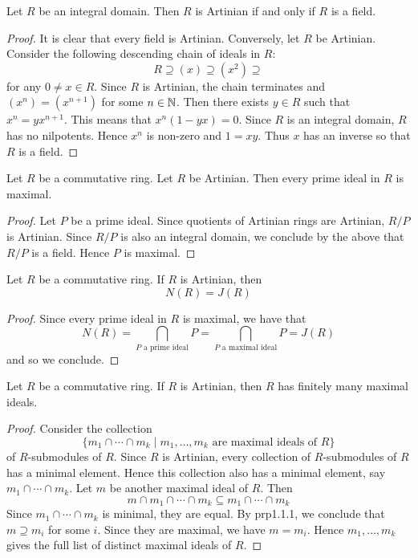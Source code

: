 \documentclass[a4paper]{article}
\begin{document}
\begin{prp}{}{} Let $R$ be an integral domain. Then $R$ is Artinian if and only if $R$ is a field. \tcbline
\begin{proof}
It is clear that every field is Artinian. Conversely, let $R$ be Artinian. Consider the following descending chain of ideals in $R$: $$R\supseteq(x)\supseteq(x^2)\supseteq$$ for any $0\neq x\in R$. Since $R$ is Artinian, the chain terminates and $(x^n)=(x^{n+1})$ for some $n\in\mathbb{N}$. Then there exists $y\in R$ such that $x^n=yx^{n+1}$. This means that $x^n(1-yx)=0$. Since $R$ is an integral domain, $R$ has no nilpotents. Hence $x^n$ is non-zero and $1=xy$. Thus $x$ has an inverse so that $R$ is a field. 
\end{proof}
\end{prp}

\begin{prp}{}{} Let $R$ be a commutative ring. Let $R$ be Artinian. Then every prime ideal in $R$ is maximal. \tcbline
\begin{proof}
Let $P$ be a prime ideal. Since quotients of Artinian rings are Artinian, $R/P$ is Artinian. Since $R/P$ is also an integral domain, we conclude by the above that $R/P$ is a field. Hence $P$ is maximal. 
\end{proof}
\end{prp}

\begin{prp}{}{} Let $R$ be a commutative ring. If $R$ is Artinian, then $$N(R)=J(R)$$ \tcbline
\begin{proof}
Since every prime ideal in $R$ is maximal, we have that $$N(R)=\bigcap_{P\text{ a prime ideal}}P=\bigcap_{P\text{ a maximal ideal}}P=J(R)$$ and so we conclude. 
\end{proof}
\end{prp}

\begin{prp}{}{} Let $R$ be a commutative ring. If $R$ is Artinian, then $R$ has finitely many maximal ideals. \tcbline
\begin{proof}
Consider the collection $$\{m_1\cap\cdots\cap m_k\;|\;m_1,\dots,m_k\text{ are maximal ideals of }R\}$$ of $R$-submodules of $R$. Since $R$ is Artinian, every collection of $R$-submodules of $R$ has a minimal element. Hence this collection also has a minimal element, say $m_1\cap\cdots\cap m_k$. Let $m$ be another maximal ideal of $R$. Then $$m\cap m_1\cap\cdots\cap m_k\subseteq m_1\cap\cdots\cap m_k$$ Since $m_1\cap\cdots\cap m_k$ is minimal, they are equal. By prp1.1.1, we conclude that $m\supseteq m_i$ for some $i$. Since they are maximal, we have $m=m_i$. Hence $m_1,\dots,m_k$ gives the full list of distinct maximal ideals of $R$. 
\end{proof}
\end{prp}
\end{document}
